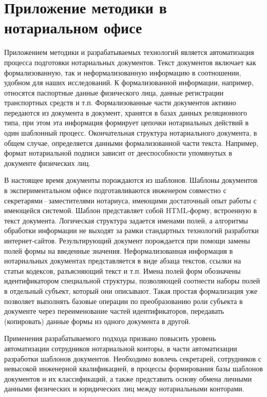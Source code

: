 \documentclass[utf8]{../IncArticle}
\begin{document}
\section{Приложение методики в нотариальном офисе}

Приложением методики и разрабатываемых технологий является
автоматизация процесса подготовки нотариальных документов.
Текст документов включает как формализованную, так и неформализованную
информацию в соотношении, удобном для наших исследований.  К
формализованной информации, например, относятся паспортные данные
физического лица, данные регистрации транспортных средств и т.п.
Формализованные части документов активно передаются из документа в
документ, хранятся в базах данных реляционного типа, при этом эта
информация формирует цепочки нотариальных действий в один шаблонный
процесс.  Окончательная структура нотариального документа, в общем случае,
определяется данными формализованной части текста.
Например, формат нотариальной подписи зависит от дееспособности
упомянутых в документе физических лиц.

В настоящее время документы порождаются из шаблонов.  Шаблоны
документов в экспериментальном офисе подготавливаются инженером
совместно с секретарями\,--\,заместителями нотариуса, имеющими
достаточный опыт работы с имеющейся системой.  Шаблон представляет
собой HTML-форму, встроенную в текст документа.  Логическая структура
задается именами полей, а алгоритмы обработки информации не выходят за
рамки стандартных технологий разработки интернет-сайтов.
Результирующий документ порождается при помощи замены полей формы на
введенные значения.  Неформализованная информация в нотариальных
документах представляется в виде абзаца текстов, ссылки на статьи
кодексов, разъясняющий текст и т.п.  Имена полей форм обозначены
идентификатором специальной структуры, позволяющей соотнести наборы
полей в отдельный субъект, который они описывают.  Такая простая
формализация уже позволяет выполнять базовые операции по
преобразованию роли субъекта в документе через переименование частей
идентификаторов, передавать (копировать) данные формы из одного
документа в другой.

Применения разрабатываемого подхода призвано повысить уровень
автоматизации сотрудников нотариальной конторы, в части автоматизации
разработки шаблонов документов. Необходимо вовлечь секретарей,
сотрудников с невысокой инженерной квалификацией, в процессы
формирования базы шаблонов документов и их классификаций, а также
представить основу обмена личными данными физических и юридических лиц
между нотариальными конторами.
\end{document}
